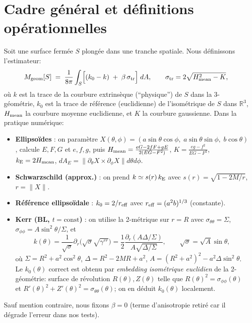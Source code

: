 \documentclass[11pt]{article}
\begin{document}
\section{Cadre g\'en\'eral et d\'efinitions op\'erationnelles}
Soit une surface ferm\'ee $S$ plong\'ee dans une tranche spatiale. Nous d\'efinissons l'estimateur:
\begin{equation}
M_{\rm geom}[S] \;=\; \frac{1}{8\pi}\int_S\!\Big[(k_0 - k)\;+\;\beta\,\sigma_{\rm tr}\Big]\; dA,
\qquad \sigma_{\rm tr}=2\sqrt{H_{\rm mean}^2-K},
\end{equation}
o\`u $k$ est la trace de la courbure extrins\`eque (``physique'') de $S$ dans la 3-g\'eom\'etrie, 
$k_0$ est la trace de r\'ef\'erence (euclidienne) de l'iso\-m\'etrique de $S$ dans $\mathbb{R}^3$, $H_{\rm mean}$ la courbure moyenne euclidienne, et $K$ la courbure gaussienne. 
Dans la pratique num\'erique:
\begin{itemize}
\item \textbf{Ellipso\"ides} : on param\`etre $X(\theta,\phi)=(a\sin\theta\cos\phi,\;a\sin\theta\sin\phi,\;b\cos\theta)$, calcule $E,F,G$ et $e,f,g$, puis 
$H_{\rm mean}=\frac{eG-2fF+gE}{2(EG-F^2)}$, $K=\frac{eg-f^2}{EG-F^2}$, $k_{\rm E}=2H_{\rm mean}$, $dA_E=\|\partial_\theta X\times\partial_\phi X\|d\theta d\phi$.
\item \textbf{Schwarzschild (approx.)} : on prend $k\simeq s(r)\,k_{\rm E}$ avec $s(r)=\sqrt{1-2M/r}$, $r=\|X\|$. 
\item \textbf{R\'ef\'erence ellipso\"idale} : $k_0=2/r_{\rm eff}$ avec $r_{\rm eff}=(a^2 b)^{1/3}$ (constante).
\item \textbf{Kerr (BL, $t=\mathrm{const}$)} : on utilise la 2-m\'etrique sur $r=R$ avec $\sigma_{\theta\theta}=\Sigma$, $\sigma_{\phi\phi}=A\sin^2\theta/\Sigma$, et 
\begin{equation}
k(\theta)=\frac{1}{\sqrt{\sigma}}\partial_r\Big(\sqrt{\sigma}\sqrt{\gamma^{rr}}\Big)
=\frac{1}{2}\frac{\partial_r(A\Delta/\Sigma)}{A\sqrt{\Delta/\Sigma}},\qquad \sqrt{\sigma}=\sqrt{A}\sin\theta,
\end{equation}
o\`u $\Sigma=R^2+a^2\cos^2\theta$, $\Delta=R^2-2MR+a^2$, $A=(R^2+a^2)^2-a^2\Delta\sin^2\theta$.
Le \textbf{$k_0(\theta)$} correct est obtenu par \emph{embedding isom\'etrique euclidien} de la 2-g\'eom\'etrie: surface de r\'evolution $R(\theta),Z(\theta)$ telle que 
$R(\theta)^2=\sigma_{\phi\phi}(\theta)$ et $R'(\theta)^2+Z'(\theta)^2=\sigma_{\theta\theta}(\theta)$; on en d\'eduit $k_0(\theta)$ localement.
\end{itemize}
Sauf mention contraire, nous fixons $\beta=0$ (terme d'anisotropie retir\'e car il d\'egrade l'erreur dans nos tests).
\end{document}
